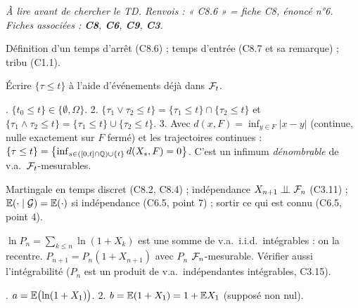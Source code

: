 \documentclass[11pt,a4paper]{article}
\begin{document}

\textit{À lire avant de chercher le TD. Renvois : « C8.6 » = fiche C8, énoncé n°6. Fiches associées : \textbf{C8}, \textbf{C6}, \textbf{C9}, \textbf{C3}.}

\begin{exo}
\outils Définition d'un temps d'arrêt (C8.6) ; temps d'entrée (C8.7 et sa remarque) ; tribu (C1.1).

\meth Écrire $\{\tau\le t\}$ à l'aide d'événements déjà dans $\mathcal{F}_t$.

. $\{t_0\le t\}\in\{\emptyset,\Omega\}$. 2. $\{\tau_1\vee\tau_2\le t\}=\{\tau_1\le t\}\cap\{\tau_2\le t\}$ et
$\{\tau_1\wedge\tau_2\le t\}=\{\tau_1\le t\}\cup\{\tau_2\le t\}$.
3. Avec $d(x,F)=\inf_{y\in F}|x-y|$ (continue, nulle exactement sur $F$ fermé) et les trajectoires continues :
$\{\tau\le t\}=\bigl\{\inf_{s\in([0,t]\cap\mathbb{Q})\cup\{t\}}d(X_s,F)=0\bigr\}$. C'est un infimum \emph{dénombrable} de v.a.\ $\mathcal{F}_t$-mesurables.
\end{exo}

\begin{exo}
\outils Martingale en temps discret (C8.2, C8.4) ; indépendance $X_{n+1}\perp\!\!\!\perp\mathcal{F}_n$ (C3.11) ; $\mathbb{E}(\cdot\mid\mathcal{G})=\mathbb{E}(\cdot)$ si indépendance
(C6.5, point 7) ; sortir ce qui est connu (C6.5, point 4).

\meth $\ln P_n=\sum_{k\le n}\ln(1+X_k)$ est une somme de v.a.\ i.i.d.\ intégrables : on la recentre. $P_{n+1}=P_n(1+X_{n+1})$ avec
$P_n$ $\mathcal{F}_n$-mesurable. Vérifier aussi l'intégrabilité ($P_n$ est un produit de v.a.\ indépendantes intégrables, C3.15).

. $a=\mathbb{E}\bigl(\ln(1+X_1)\bigr)$. 2. $b=\mathbb{E}(1+X_1)=1+\mathbb{E} X_1$ (supposé non nul).
\end{exo}
\end{document}
